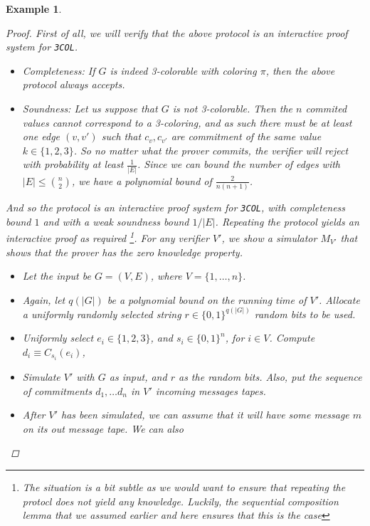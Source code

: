 \documentclass{article}
\newtheorem{example}{Example}
\begin{document}
\begin{example}
    \begin{proof}
        First of all, we will verify that the above protocol is an interactive proof system for \texttt{3COL}.
        \begin{itemize}
            \item Completeness: If $G$ is indeed 3-colorable with coloring $\pi$, then the above protocol always accepts.
            \item Soundness: Let us suppose that $G$ is not 3-colorable. Then the $n$ commited values cannot 
                            correspond to a 3-coloring, and as such there must be at least one edge $(v, v')$ such that
                            $c_v, c_{v'}$ are commitment of the same value $k \in \{1, 2, 3\}$. So no matter what the 
                            prover commits, the verifier will reject with probability at least $\frac{1}{|E|}$. Since we can bound 
                            the number of edges with $|E| \leq \binom{n}{2}$, we have a polynomial bound of $\frac{2}{n(n+1)}$.
        \end{itemize}
        And so the protocol is an interactive proof system for \texttt{3COL}, with completeness bound $1$ and 
        with a weak soundness bound $1/|E|$. Repeating the protocol yields an interactive proof as required
        \footnote{The situation is a bit subtle as we would want to ensure that repeating the protocl does not yield any knowledge.
        Luckily, the sequential composition lemma that we assumed earlier and here ensures that this is the case}. 
        For any verifier $V'$, we show a simulator $M_{V'}$ that shows that the prover has the zero knowledge property.
        \begin{itemize}
            \item Let the input be $G = (V, E)$, where $V = \{1, \dots, n \}$.
            \item Again, let $q(|G|)$ be a polynomial bound on the running time of $V'$. Allocate a uniformly randomly selected string $r \in \{0, 1\}^{q(|G|)}$ random bits to be used.
            \item Uniformly select $e_i \in \{1, 2, 3\}$, and $s_i \in \{ 0, 1\}^n$, for $i \in V$. Compute $d_i \equiv C_{s_i}(e_i)$, 
            \item Simulate $V'$ with $G$ as input, and $r$ as the random bits. Also, put the sequence of commitments $d_1, \dots d_n$ in $V'$ incoming messages tapes.
            \item After $V'$ has been simulated, we can assume that it will have some message $m$ on its out message tape. We can also

\end{itemize}
\end{proof}
\end{example}
\end{document}
